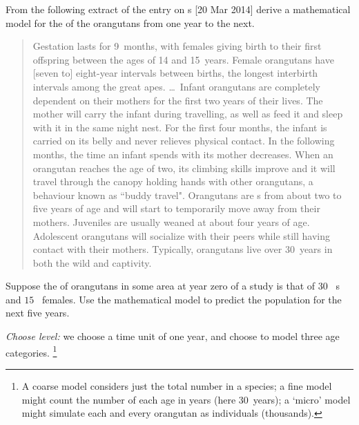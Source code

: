 \begin{example}[orangutans] \label{eg:orang}
From the following  extract of the  entry on s [20 Mar 2014] derive a mathematical model for the  of the orangutans from one year to the next.
\begin{quote}
Gestation lasts for 9~months, with females giving birth to their first offspring between the ages of 14 and 15~years. Female orangutans have [seven to] eight-year intervals between births, the longest interbirth intervals among the great apes. \ldots\  Infant orangutans are completely dependent on their mothers for the first two years of their lives. The mother will carry the infant during travelling, as well as feed it and sleep with it in the same night nest. For the first four months, the infant is carried on its belly and never relieves physical contact. In the following months, the time an infant spends with its mother decreases. When an orangutan reaches the age of two, its climbing skills improve and it will travel through the canopy holding hands with other orangutans, a behaviour known as ``buddy travel". Orangutans are s from about two to five years of age and will start to temporarily move away from their mothers.  Juveniles are usually weaned at about four years of age. Adolescent orangutans will socialize with their peers while still having contact with their mothers. Typically, orangutans live over 30~years in both the wild and captivity.
\end{quote}
Suppose the  of orangutans in some area at year zero of a study is that of \(30\)~ s and \(15\)~ females.
Use the mathematical model to predict the population for the next five years.

\begin{solution} 
\emph{Choose level:}  we choose a time unit of one year, and choose to model three age categories.%
\footnote{A coarse model considers just the total number in a species; a fine model might count the number of each age in years (here 30~years); a `micro' model might simulate each and every orangutan as individuals (thousands).}


\end{solution}
\end{example}

